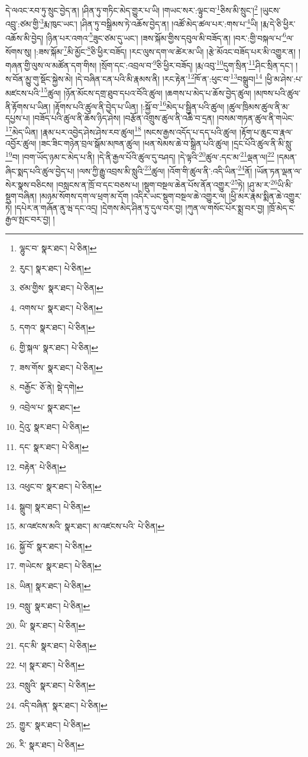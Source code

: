 དེ་ལའང་རབ་ཏུ་སྲུང་བྱེད་ན། །ཤིན་ཏུ་གཏིང་མེད་གྱུར་པ་ཡི། །གཡང་སར་:ལྟུང་བ་\footnote{ལྷུང་བ་  སྣར་ཐང་།  པེ་ཅིན། }ཅིས་མི་སྲུང་།\footnote{རུང་།  སྣར་ཐང་།  པེ་ཅིན། } །ཡུངས་འབྲུ་:ཙམ་གྱི་\footnote{ཙམ་གྱིས་  སྣར་ཐང་།  པེ་ཅིན། }རྨ་ཁུང་ཡང་། །ཤིན་ཏུ་བསྒྲིམས་ཏེ་འཆོས་བྱེད་ན། །འཚོ་མེད་ཚལ་པར་:གས་པ་\footnote{འགས་པ་  སྣར་ཐང་།  པེ་ཅིན། }ཡི། །རྨ་དེ་ཅི་ཕྱིར་འཆོས་མི་བྱེད། །ཉིན་པར་འགའ་\footnote{དགའ་  སྣར་ཐང་།  པེ་ཅིན། }ཟུང་ཙམ་དུ་ཡང་། །ཟས་སྐོམ་གྱིས་དབུལ་མི་བཟོད་ན། །བར་:གྱི་བསྐལ་པ་\footnote{གྱི་སྐལ་  སྣར་ཐང་།  པེ་ཅིན། }ལ་སོགས་སུ། །:ཟས་སྐོམ་\footnote{ཟས་གོས་  སྣར་ཐང་།  པེ་ཅིན། }མི་མྱོང་\footnote{བརྒྱོང་  ཅོ་ནེ།  སྡེ་དགེ། }ཅི་ཕྱིར་བཟོད། །རང་ལུས་དག་ལ་ཚེར་མ་ཡི། །རྩེ་མོའང་བཟོད་པར་མི་འགྱུར་ན། །གཞན་གྱི་ལུས་ལ་མཚོན་དག་གིས། །སྲོག་དང་:འབྲལ་བ་\footnote{འབྲེལ་པ་  སྣར་ཐང་། }ཅི་ཕྱིར་བཟོད། །རྨ་འབུ་\footnote{དྲེའུ་  སྣར་ཐང་།  པེ་ཅིན། }དུག་སྲིན་\footnote{དང་  སྣར་ཐང་།  པེ་ཅིན། }ཤིང་སྲིན་དང་། །ས་བོན་མྱུ་གུ་སྡོང་སྐྱེས་མེ། །དེ་བཞིན་ངན་པའི་མི་རྣམས་ནི། །རང་རྟེན་\footnote{བརྟེན་  པེ་ཅིན། }ཁོ་ན་:ཕུང་བ་\footnote{འཕུང་བ་  སྣར་ཐང་།  པེ་ཅིན། }བསྒྲུབ།\footnote{སྒྲུབ།  སྣར་ཐང་།  པེ་ཅིན། } །ཕྱི་མ་ཤེས་:པ་མཛངས་པའི་\footnote{མ་འཛངས་མའི་  སྣར་ཐང་། མ་འཛངས་པའི་  པེ་ཅིན། }ཚུལ། །ཉོན་མོངས་དགྲ་ཐུབ་དཔའ་བོའི་ཚུལ། །ཆགས་པ་མེད་པ་ཆོས་བྱེད་ཚུལ། །མཁས་པའི་ཚུལ་ནི་རྟོགས་པ་ཡིན། །རྟོགས་པའི་ཚུལ་ནི་བྱེད་པ་ཡིན། །:སྐྱོ་བ་\footnote{སྐྱོ་བོ་  སྣར་ཐང་།  པེ་ཅིན། }མེད་པ་སྦྱིན་པའི་ཚུལ། །ཚུལ་ཁྲིམས་ཚུལ་ནི་མ་དཔྱས་པ། །བཟོད་པའི་ཚུལ་ནི་ཆོས་ཉིད་ཤེས། །བརྩོན་འགྲུས་ཚུལ་ནི་འཆི་བ་དྲན། །བསམ་གཏན་ཚུལ་ནི་གཡེང་\footnote{གཡེངས་  སྣར་ཐང་།  པེ་ཅིན། }མེད་ཡིན། །རྣམ་པར་འབྱེད་ཤེས་ཤེས་རབ་ཚུལ།\footnote{ཡིན།  སྣར་ཐང་།  པེ་ཅིན། } །སངས་རྒྱས་འདོད་པ་དད་པའི་ཚུལ། །རྟོག་པ་ཆུང་བ་རྣལ་འབྱོར་ཚུལ། །ཟང་ཟིང་གཉེན་བྲལ་སྒོམ་མཁན་ཚུལ། །ཕན་སེམས་ཆེ་བ་སྒྲིན་པའི་ཚུལ། །དྲང་པོའི་ཚུལ་ནི་མི་སླུ་\footnote{བསླུ་  སྣར་ཐང་།  པེ་ཅིན། }བ། །བག་ཡོད་ཉམ་ང་མེད་པ་ནི། །དེ་ནི་རྒྱལ་པོའི་ཚུལ་དུ་བཤད། །དེ་ལྟའི་\footnote{ཡི་  སྣར་ཐང་།  པེ་ཅིན། }ཚུལ་:དང་མ་\footnote{དང་མི་  སྣར་ཐང་།  པེ་ཅིན། }ལྡན་ལ།\footnote{པ།  སྣར་ཐང་།  པེ་ཅིན། } །དམན་ཞིང་སྨད་པའི་ཚུལ་བྱེད་པ། །ལས་ཀྱི་རྒྱུ་འབྲས་མི་སླུའི་\footnote{བསླུའི་  སྣར་ཐང་།  པེ་ཅིན། }ཚུལ། །འོག་གི་ཚུལ་ནི་:འདི་ཡིན་\footnote{འདི་བཞིན་  སྣར་ཐང་།  པེ་ཅིན། }ནོ། །ཡོན་ཏན་ལྡན་ལ་སེར་སྣས་བཅིངས། །བསླངས་ན་ཁྲོ་བ་དང་བཅས་པ། །སྡུག་བསྔལ་ཆེན་པོས་ནོན་འགྱུར་\footnote{གྱུར་  སྣར་ཐང་།  པེ་ཅིན། }ཏེ། །ཤུ་མ་ར་\footnote{རི་  སྣར་ཐང་།  པེ་ཅིན། }ཡི་མི་སྡུག་བཞིན། །མཉམ་སོགས་དག་ལ་ཕྲག་མ་དོག །འདིར་ཡང་སྡུག་བསྔལ་ཆེ་འགྱུར་ལ། །ཕྱི་མར་རྣམ་སྨིན་ཆེ་འགྱུར་ཏེ། །དཔེར་ན་གཞོན་ནུ་ཝ་དང་འདྲ། །དྲེགས་མེད་ཤིན་ཏུ་དུལ་བར་བྱ། །ཀུན་ལ་གསོང་པོར་སྨྲ་བར་བྱ། །ཁྲོ་མེད་ང་རྒྱལ་སྤང་བར་བྱ། །
